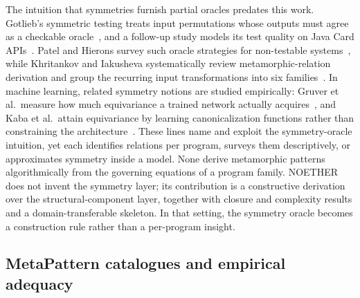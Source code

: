 \documentclass[acmsmall,screen,anonymous,review]{acmart}
\begin{document}
The intuition that symmetries furnish partial oracles predates this work. Gotlieb's symmetric testing treats input permutations whose outputs must agree as a checkable oracle~\cite{Gotlieb2003Symmetries}, and a follow-up study models its test quality on Java Card APIs~\cite{GotliebBernard2006}. Patel and Hierons survey such oracle strategies for non-testable systems~\cite{PatelHierons2018}, while Khritankov and Iakusheva systematically review metamorphic-relation derivation and group the recurring input transformations into six families~\cite{KhritankovIakusheva2024}. In machine learning, related symmetry notions are studied empirically: Gruver et al.\ measure how much equivariance a trained network actually acquires~\cite{Gruver2023LieDerivative}, and Kaba et al.\ attain equivariance by learning canonicalization functions rather than constraining the architecture~\cite{Kaba2023Canonicalization}. These lines name and exploit the symmetry-oracle intuition, yet each identifies relations per program, surveys them descriptively, or approximates symmetry inside a model. None derive metamorphic patterns algorithmically from the governing equations of a program family. NOETHER does not invent the symmetry layer; its contribution is a constructive derivation over the structural-component layer, together with closure and complexity results and a domain-transferable skeleton. In that setting, the symmetry oracle becomes a construction rule rather than a per-program insight.

\subsection{MetaPattern catalogues and empirical adequacy}
\end{document}
